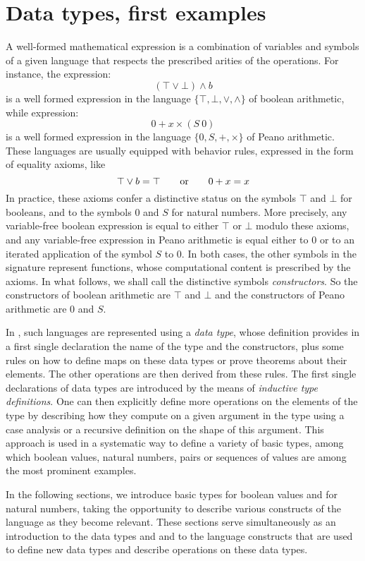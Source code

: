 \section{Data types, first examples}
\label{sec:data}
A well-formed mathematical expression is a combination of variables
and symbols of a given language
that respects the prescribed arities of
the operations. For instance, the expression:
\[(\top \vee \bot) \wedge b\]
is a well formed expression in the language $\{\top, \bot,\vee,\wedge\}$ of
boolean arithmetic, while expression:
\[ 0 + x \times (S\ 0) \]
is a well formed expression in the language $\{0,S, +, \times\}$ of
Peano arithmetic.  These languages are usually equipped with
behavior rules, expressed in the form of equality axioms, like
\[\top \vee b = \top \qquad \hbox{or} \qquad 0 + x = x\]
In
practice, these axioms confer a distinctive status on
the symbols $\top$ and $\bot$ for booleans, and to the symbols $0$ and
$S$ for natural numbers. More precisely, any variable-free boolean expression
is equal to either $\top$ or $\bot$ modulo these axioms, and any
variable-free expression in Peano arithmetic is equal either to $0$ or
to an iterated application of the symbol $S$ to $0$.  In both
cases, the other symbols in the signature represent functions, whose
computational content is prescribed by the axioms.  In what follows,
we shall call the distinctive symbols \emph{constructors}.  So the constructors
of boolean arithmetic are \(\top\) and \(\bot\) and the constructors of
Peano arithmetic are \(0\) and \(S\).

In \Coq{}, such languages are represented using a \emph{data type},
whose definition provides in a first single declaration the name of the
type and the constructors, plus some rules on how to define maps on
these data types or prove theorems about their elements.  The other
operations are then derived from these rules.
The first single declarations of data types are introduced by the means of
\emph{inductive type definitions}.
One can then explicitly define more operations on the elements of
the type by describing how they compute on a given argument in the
type using a case analysis or a recursive definition on the
shape of this argument.
This approach is used in a systematic way to define a variety of basic
types, among which boolean values, natural numbers, pairs or
sequences of values are among the most prominent examples.

In the following sections, we introduce basic types  for boolean
values and  for natural numbers, taking the opportunity to describe
various constructs of the \Coq{} language as they become relevant.  These
sections serve simultaneously as an introduction to the data types
 and  and to the \Coq{} language constructs that
are used to define new data types and describe operations on these
data types.
